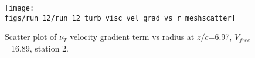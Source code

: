 \begin{figure}[H]
\centering
\texttt{[image: figs/run\_12/run\_12\_turb\_visc\_vel\_grad\_vs\_r\_meshscatter]}
\caption{Scatter plot of $\nu_T$ velocity gradient term vs radius at $z/c$=6.97, $V_{free}$=16.89, station 2.}
\label{fig:run_12_turb_visc_vel_grad_vs_r_meshscatter}
\end{figure}



